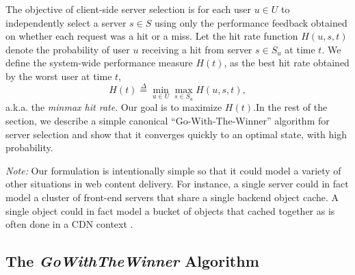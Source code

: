\documentclass[conference]{IEEEtran}
\newcommand{\comment}[1]{}
\begin{document}
The objective of client-side server selection is for each user $u \in U$ to independently  select a server $s \in S$ using only the performance feedback obtained on whether each request was a hit or a miss. Let  the hit rate function $H(u,s,t)$ denote the probability of user $u$ receiving a hit from server $s \in S_u$ at time $t$. We define the system-wide performance measure $H(t)$, as the best hit rate obtained by the worst user at time $t$,
 \begin{equation}\label{eq:Ht}
  H(t) \stackrel{\Delta}{=} \min_{u \in U} \max_{s \in S_u} H(u, s, t),
\end{equation}
a.k.a. the \textsl{minmax hit rate}.  Our goal is to maximize $H(t)$.In the rest of the section, we describe a simple canonical  ``Go-With-The-Winner''  algorithm for server selection and show that it converges quickly to an optimal state, with high probability.

{\em Note:} Our formulation is intentionally simple so that it could model a variety of other situations in web content delivery. For instance, a single server could in fact model a cluster of front-end servers that share a single backend object cache. A single object could in fact model a bucket of objects that cached together as is often done in a CDN context \cite{nygren2010akamai}. 

\subsection{The \textsl{GoWithTheWinner} Algorithm}
\comment{After each user $u \in U$ has picked an content item using the power law distribution described in Equation~\ref{eq:powerlaw},  algorithm \textsl{GoWithTheWinner} described below is executed independently by each user $u \in U$ to select a server that's likely to have the content. In this algorithm, each user locally executes a simple ``Go-With-The-Winner'' strategy of trying out $\sigma$ randomly chosen candidate servers initially.  Then, using the past hit rate over a time window of length $\tau$ as feedback, each user independently either chooses to continue with all the servers in $S_u$ or decides on a  single server that provided the best performance.  If multiple servers provided a $100\%$ hit rate in line 8 of the algorithm, the user decides to use the first one found.} 
\end{document}
